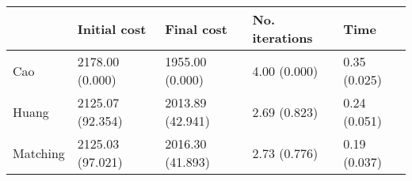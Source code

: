 \begin{tabular}{lllll}
\toprule
{} &      Initial cost &        Final cost & No. iterations &          Time \\
\midrule
Cao      &   2178.00 (0.000) &   1955.00 (0.000) &   4.00 (0.000) &  0.35 (0.025) \\
Huang    &  2125.07 (92.354) &  2013.89 (42.941) &   2.69 (0.823) &  0.24 (0.051) \\
Matching &  2125.03 (97.021) &  2016.30 (41.893) &   2.73 (0.776) &  0.19 (0.037) \\
\bottomrule
\end{tabular}
